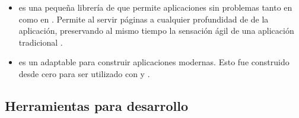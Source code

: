 \begin{itemize}
		\item
			\textbf{\rendrNAME} es una pequeña librería de \airbnbNAME \cite{online_technology_airbnb_officialsite} que permite \runCPT aplicaciones \backbonejsNAME sin problemas tanto en \clientSideAS como en \serverSideAS. Permite al \webserverINT servir páginas \htmlNAME \fullyFormedCPT a cualquier profundidad de \linkINT de la aplicación, preservando al mismo tiempo la sensación ágil de una aplicación \mvcAS \clientSideAS \backbonejsNAME tradicional \cite{online_technology_isomorphic_javascript_frameworks}.
		\item
			\textbf{\flatironNAME} es un \frameworkPC adaptable para construir aplicaciones \webINT modernas. Esto fue construido desde cero para ser utilizado con \javaScriptNAME y \nodejsNAME \cite{online_technology_flatiron_officialsite}.

	\end{itemize}

	

\subsection{Herramientas para desarrollo}

